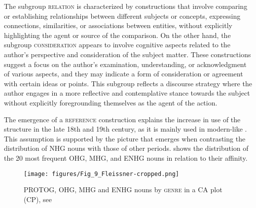 \documentclass[output=paper,colorlinks,citecolor=brown]{langscibook}
\begin{document}
The subgroup \textsc{relation} is characterized by constructions that involve comparing or establishing relationships between different subjects or concepts, expressing connections, similarities, or associations between entities, without explicitly highlighting the agent or source of the comparison. On the other hand, the subgroup \textsc{consideration} appears to involve cognitive aspects related to the author's perspective and consideration of the subject matter. These constructions suggest a focus on the author's examination, understanding, or acknowledgment of various aspects, and they may indicate a form of consideration or agreement with certain ideas or points. This subgroup reflects a discourse strategy where the author engages in a more reflective and contemplative stance towards the subject without explicitly foregrounding themselves as the agent of the action.

The emergence of a \textsc{reference} construction explains the increase in use of the structure in the late 18th and 19th century, as it is mainly used in modern-like . This assumption is supported by the picture that emerges when contrasting the distribution of NHG nouns with those of other periods.  shows the distribution of the 20 most frequent OHG, MHG, and ENHG nouns in relation to their  affinity.

\begin{figure}
    \texttt{[image: figures/Fig\_9\_Fleissner-cropped.png]}
    \caption{PROTOG, OHG, MHG and ENHG nouns by \textsc{genre} in a CA plot (CP), see }
    \label{fig:fleissner:7}
\end{figure}
\end{document}
